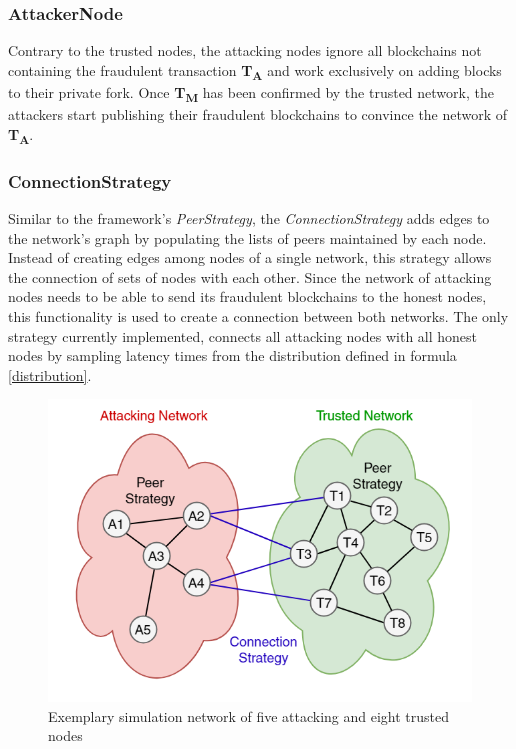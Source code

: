\documentclass[a4paper,12pt,twoside]{report}
\begin{document}
\subsubsection{AttackerNode}
Contrary to the trusted nodes, the attacking nodes ignore all blockchains not containing the fraudulent transaction \textbf{T\textsubscript{A}} and work exclusively on adding blocks to their private fork. Once \textbf{T\textsubscript{M}} has been confirmed by the trusted network, the attackers start publishing their fraudulent blockchains to convince the network of \textbf{T\textsubscript{A}}.
\subsubsection{ConnectionStrategy} \label{connstrat}
Similar to the framework's \textit{PeerStrategy}, the \textit{ConnectionStrategy} adds edges to the network's graph by populating the lists of peers maintained by each node. Instead of creating edges among nodes of a single network, this strategy allows the connection of sets of nodes with each other. Since the network of attacking nodes needs to be able to send its fraudulent blockchains to the honest nodes, this functionality is used to create a connection between both networks. The only strategy currently implemented, connects all attacking nodes with all honest nodes by sampling latency times from the distribution defined in formula \ref{distribution}.
\begin{figure}[ht]
	\centering
  \includegraphics[width=\textwidth]{Network.png}
	\caption{Exemplary simulation network of five attacking and eight trusted nodes}
	\label{network}
\end{figure}
\end{document}
